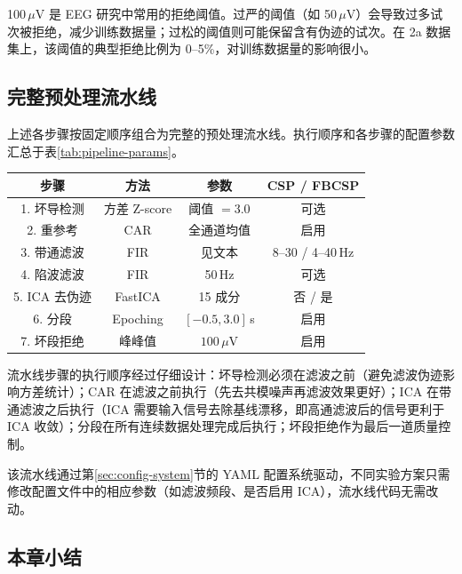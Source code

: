 100\,$\mu$V 是 EEG 研究中常用的拒绝阈值。过严的阈值（如 50\,$\mu$V）会导致过多试次被拒绝，减少训练数据量；过松的阈值则可能保留含有伪迹的试次。在 2a 数据集上，该阈值的典型拒绝比例为 0--5\%，对训练数据量的影响很小。

\subsection{完整预处理流水线}
\label{sec:pipeline}

上述各步骤按固定顺序组合为完整的预处理流水线。执行顺序和各步骤的配置参数汇总于表\ref{tab:pipeline-params}。

\begin{table}[htbp]
	\centering
	\begin{tabular}{cccc}
		\toprule
		步骤 & 方法 & 参数 & CSP / FBCSP \\
		\midrule
		1. 坏导检测 & 方差 Z-score & 阈值 $= 3.0$ & 可选 \\
		2. 重参考 & CAR & 全通道均值 & 启用 \\
		3. 带通滤波 & FIR & 见文本 & 8--30 / 4--40\,Hz \\
		4. 陷波滤波 & FIR & 50\,Hz & 可选 \\
		5. ICA 去伪迹 & FastICA & 15 成分 & 否 / 是 \\
		6. 分段 & Epoching & $[-0.5, 3.0]$\,s & 启用 \\
		7. 坏段拒绝 & 峰峰值 & $100\,\mu$V & 启用 \\
		\bottomrule
	\end{tabular}
\end{table}

流水线步骤的执行顺序经过仔细设计：坏导检测必须在滤波之前（避免滤波伪迹影响方差统计）；CAR 在滤波之前执行（先去共模噪声再滤波效果更好）；ICA 在带通滤波之后执行（ICA 需要输入信号去除基线漂移，即高通滤波后的信号更利于 ICA 收敛）；分段在所有连续数据处理完成后执行；坏段拒绝作为最后一道质量控制。

该流水线通过第\ref{sec:config-system}节的 YAML 配置系统驱动，不同实验方案只需修改配置文件中的相应参数（如滤波频段、是否启用 ICA），流水线代码无需改动。

\subsection{本章小结}

